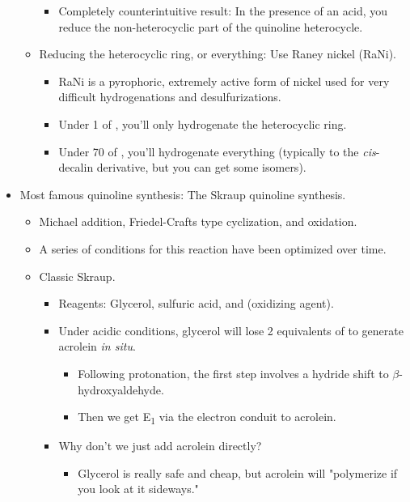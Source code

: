 \documentclass[../notes.tex]{subfiles}
\begin{document}
\begin{itemize}
\begin{itemize}
\begin{itemize}
            \item Completely counterintuitive result: In the presence of an acid, you reduce the non-heterocyclic part of the quinoline heterocycle.
        \end{itemize}
        \item Reducing the heterocyclic ring, or everything: Use Raney nickel (RaNi).
        \begin{itemize}
            \item RaNi is a pyrophoric, extremely active form of nickel used for very difficult hydrogenations and desulfurizations.
            \item Under \SI{1}{\atmosphere} of , you'll only hydrogenate the heterocyclic ring.
            \item Under \SI{70}{\atmosphere} of , you'll hydrogenate everything (typically to the \emph{cis}-decalin derivative, but you can get some isomers).
        \end{itemize}
    \end{itemize}
    \item Most famous quinoline synthesis: The Skraup quinoline synthesis.
    \begin{itemize}
        \item Michael addition, Friedel-Crafts type cyclization, and oxidation.
        \item A series of conditions for this reaction have been optimized over time.
        \item Classic Skraup.
        \begin{itemize}
            \item Reagents: Glycerol, sulfuric acid, and  (oxidizing agent).
            \item Under acidic conditions, glycerol will lose 2 equivalents of  to generate acrolein \emph{in situ}.
            \begin{itemize}
                \item Following protonation, the first step involves a hydride shift to $\beta$-hydroxyaldehyde.
                \item Then we get E\textsubscript{1} via the electron conduit to acrolein.
            \end{itemize}
            \item Why don't we just add acrolein directly?
            \begin{itemize}
                \item Glycerol is really safe and cheap, but acrolein will "polymerize if you look at it sideways."

\end{itemize}
\end{itemize}
\end{itemize}
\end{itemize}
\end{document}
